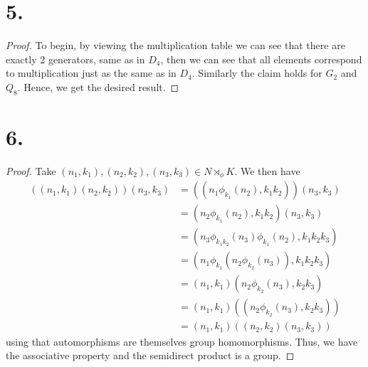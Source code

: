 \documentclass{article}
\begin{document}
\section*{5.}
\begin{proof}
    To begin, by viewing the multiplication table we can see that there are exactly 2 generators, same as in $D_4$, then we can see that all elements correspond to multiplication just as the same as in $D_4$. Similarly the claim holds for $G_2$ and $Q_8$. Hence, we get the desired result. 
\end{proof}

\section*{6.}
\begin{proof}
    Take $(n_1, k_1), (n_2, k_2), (n_3, k_3) \in N\rtimes_{\phi} K$. We then have
    \begin{align*}
        ((n_1, k_1)(n_2, k_2))(n_3, k_3) &= ((n_1\phi_{k_1}(n_2), k_1k_2))(n_3, k_3) \\
        &= (n_2\phi_{k_1}(n_2), k_1k_2)(n_3, k_3) \\
        &= (n_3\phi_{k_1k_2}(n_3)\phi_{k_1}(n_2), k_1k_2k_3)\\
        &= (n_1\phi_{k_1}(n_2\phi_{k_2}(n_3)),k_1k_2k_3)\\
        &= (n_1, k_1)(n_2\phi_{k_2}(n_3), k_2k_3)\\
        &= (n_1, k_1)((n_2\phi_{k_2}(n_3), k_2k_3)) \\
        &= (n_1, k_1)((n_2, k_2)(n_3, k_3))
    \end{align*}
    using that automorphisms are themselves group homomorphisms. Thus, we have the associative property and the semidirect product is a group. 
\end{proof}
\end{document}
